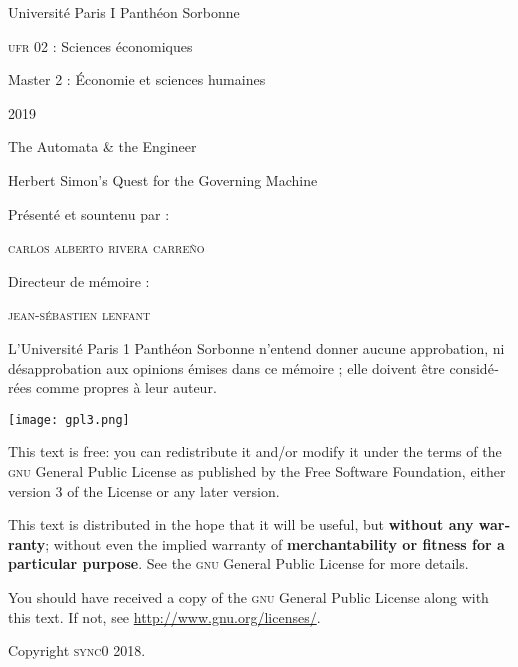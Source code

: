 \documentclass[draft=false, paper=A4,portrait,twoside=true,twocolumn=false,headinclude=false,footinclude=false,fontsize=11,BCOR=15mm,DIV=calc,pagesize=auto,titlepage=firstiscover,mpinclude=true,headings=big,headings=twolinechapter,open=right,chapterprefix=false,headsepline=false,parskip=full]{scrbook}
\author{Carlos Alberto Rivera Carreño}
\date{}
\title{}
\begin{document}
\begin{titlepage}
 \centering
 \vspace{4\baselineskip}
\begin{french}
 {\Large Université Paris I Panthéon Sorbonne \par}
 {\Large \textsc{ufr} 02 : Sciences économiques  \par}
 {\large Master 2 : Économie et sciences humaines \par}
 {\large 2019 \par}
\end{french}
 \vspace{2\baselineskip}
 {\huge The Automata \& the Engineer \par}
 {\Large Herbert Simon's Quest for the Governing Machine \par}
\vspace*{\fill}
\begin{french}
 {\large Présenté et sountenu par : \par}
\end{french}
 {\large \textsc{carlos alberto rivera carreño}\par}
 \vspace{1\baselineskip}
\begin{french}
 {\large Directeur de mémoire : \par}
\end{french}
 {\large \textsc{jean-sébastien lenfant}\par}
\end{titlepage}

\pagestyle{empty}

\begin{french}
L'Université Paris 1 Panthéon Sorbonne n'entend donner aucune approbation,
ni désapprobation aux opinions émises dans ce mémoire ; elle doivent être
considérées comme propres à leur auteur. 
\end{french}

\newpage
\vspace*{\fill}
\noindent
\texttt{[image: gpl3.png]}\par
\vspace{1\baselineskip}
\begin{english}
This text is free: you can redistribute it and/or modify it
under the terms of the \textsc{gnu} General Public License as published by
the Free Software Foundation, either version 3 of the License or any later
version.

This text is distributed in the hope that it will be useful, but \textbf{without
any warranty}; without even the implied warranty of \textbf{merchantability or 
fitness for a particular purpose}. See the \textsc{gnu} General 
Public License for more details.

You should have received a copy of the \textsc{gnu} General Public License along
with this text. If not, see \url{http://www.gnu.org/licenses/}.

\vspace{1\baselineskip}
\noindent
Copyright \textcopyright \textsc{sync0} 2018. 
\end{english}
\end{document}
